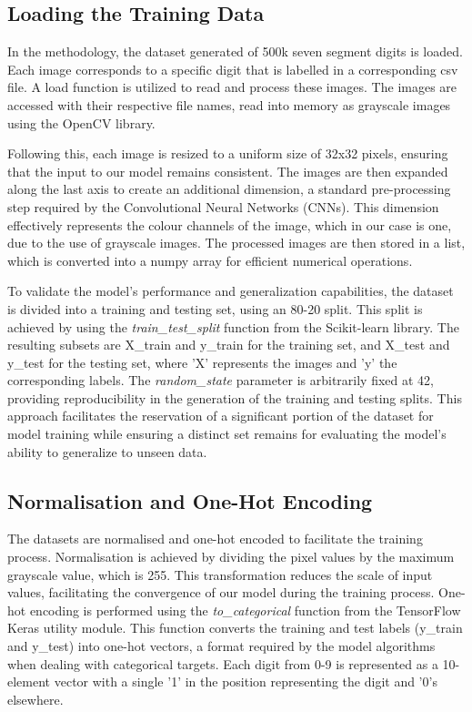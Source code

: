 \subsection{Loading the Training Data}
In the methodology, the dataset generated of 500k seven segment digits is loaded. Each image corresponds to a specific digit that is labelled in a corresponding csv file. A load function is utilized to read and process these images. The images are accessed with their respective file names, read into memory as grayscale images using the OpenCV library.

Following this, each image is resized to a uniform size of 32x32 pixels, ensuring that the input to our model remains consistent. The images are then expanded along the last axis to create an additional dimension, a standard pre-processing step required by the Convolutional Neural Networks (CNNs). This dimension effectively represents the colour channels of the image, which in our case is one, due to the use of grayscale images. The processed images are then stored in a list, which is converted into a numpy array for efficient numerical operations.


To validate the model's performance and generalization capabilities, the dataset is divided into a training and  testing set, using an 80-20 split. This split is achieved by using the \textit{train\_test\_split} function from the Scikit-learn library. The resulting subsets are X\_train and y\_train for the training set, and X\_test and y\_test for the testing set, where 'X' represents the images and 'y' the corresponding labels. The \textit{random\_state} parameter is arbitrarily fixed at 42, providing reproducibility in the generation of the training and testing splits. This approach facilitates the reservation of a significant portion of the dataset for model training while ensuring a distinct set remains for evaluating the model's ability to generalize to unseen data.

\subsection{Normalisation and One-Hot Encoding}
The datasets are normalised and one-hot encoded to facilitate the training process. Normalisation is achieved by dividing the pixel values by the maximum grayscale value, which is 255. This transformation reduces the scale of input values, facilitating the convergence of our model during the training process. One-hot encoding is performed using the \textit{to\_categorical} function from the TensorFlow Keras utility module. This function converts the training and test labels (y\_train and y\_test) into one-hot vectors, a format required by the model algorithms when dealing with categorical targets. Each digit from 0-9 is represented as a 10-element vector with a single '1' in the position representing the digit and '0's elsewhere.

